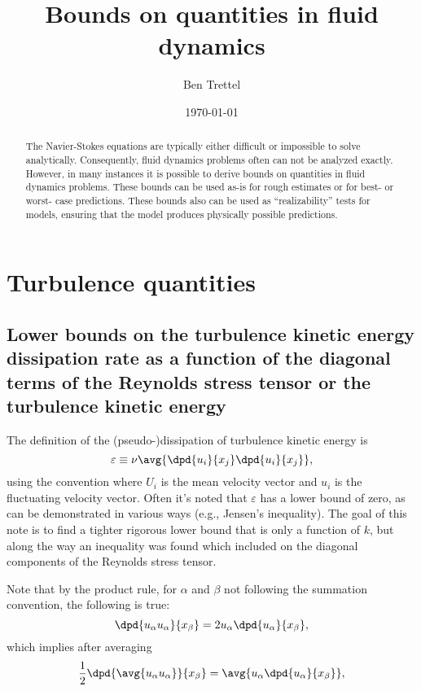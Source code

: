 \documentclass[ccbysa,note]{bmtreport}
\title{Bounds on quantities in fluid dynamics}
\author{Ben Trettel}
\date{\today} %
\begin{document}
\maketitle
\begin{abstract}
The Navier-Stokes equations are typically either difficult or impossible to solve analytically. Consequently, fluid dynamics problems often can not be analyzed exactly. However, in many instances it is possible to derive bounds on quantities in fluid dynamics problems. These bounds can be used as-is for rough estimates or for best- or worst- case predictions. These bounds also can be used as ``realizability'' tests for models, ensuring that the model produces physically possible predictions.
\end{abstract}

\section{Turbulence quantities}

\subsection{Lower bounds on the turbulence kinetic energy dissipation rate as a function of the diagonal terms of the Reynolds stress tensor or the turbulence kinetic energy}

The definition of the (pseudo-)dissipation of turbulence kinetic energy is
\begin{equation}
   \varepsilon \equiv \nu \avg{\dpd{u_i}{x_j} \dpd{u_i}{x_j}},
\end{equation}
using the convention where $U_i$ is the mean velocity vector and $u_i$ is the fluctuating velocity vector. Often it's noted that $\varepsilon$ has a lower bound of zero, as can be demonstrated in various ways (e.g., Jensen's inequality). The goal of this note is to find a tighter rigorous lower bound that is only a function of $k$, but along the way an inequality was found which included on the diagonal components of the Reynolds stress tensor.

Note that by the product rule, for $\alpha$ and $\beta$ not following the summation convention, the following is true:
\begin{equation}
   \dpd{u_\alpha u_\alpha}{x_\beta} = 2 u_\alpha \dpd{u_\alpha}{x_\beta}, %
\end{equation}
which implies after averaging
\begin{equation}
   \frac{1}{2} \dpd{\avg{u_\alpha u_\alpha}}{x_\beta} = \avg{u_\alpha \dpd{u_\alpha}{x_\beta}}, \label{eq:diag to individual}
\end{equation}
\end{document}

